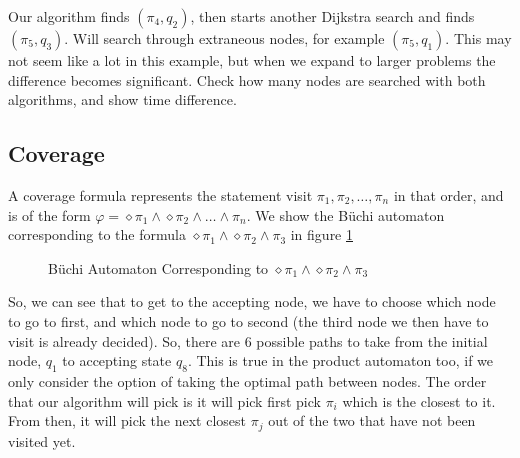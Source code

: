 Our algorithm finds $(\pi_4,q_2)$, then starts another Dijkstra search and finds $(\pi_5,q_3)$. Will search through extraneous nodes, for example $(\pi_5,q_1)$. This may not seem like a lot in this example, but when we expand to larger problems the difference becomes significant. Check how many nodes are searched with both algorithms, and show time difference.

\subsection{Coverage}
A coverage formula represents the statement visit $\pi_1, \pi_2, \dots, \pi_n$ in that order, and is of the form $\varphi = \diamond \pi_1 \wedge \diamond \pi_2 \wedge \dots \wedge \pi_n$. We show the B\"uchi automaton corresponding to the formula $\diamond \pi_1 \wedge \diamond \pi_2 \wedge \pi_3$ in figure \ref{fig:buchCov}

\begin{figure}
\centering
{}
\caption{B\"uchi Automaton Corresponding to $\diamond \pi_1 \wedge \diamond \pi_2 \wedge \pi_3$}
\label{fig:buchCov}
\end{figure}

So, we can see that to get to the accepting node, we have to choose which node to go to first, and which node to go to second (the third node we then have to visit is already decided). So, there are 6 possible paths to take from the initial node, $q_1$ to accepting state $q_8$. This is true in the product automaton too, if we only consider the option of taking the optimal path between nodes. The order that our algorithm will pick is it will pick first pick $\pi_i$ which is the closest to it. From then, it will pick the next closest $\pi_j$ out of the two that have not been visited yet.

